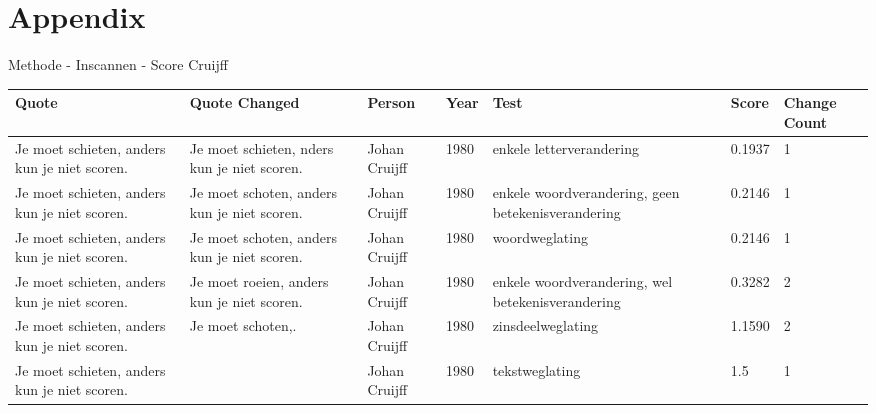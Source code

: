 \documentclass[12pt]{article}
\begin{document}
\printbibliography[heading=none]

\pagebreak
\section{Appendix} 

\Large Methode - Inscannen - Score
\noindent\large Cruijff
\small
\begin{longtable}{|p{}|p{}|p{}|p{}|p{}|p{}|p{}|}
\hline
\textbf{Quote} & \textbf{Quote Changed} & \textbf{Person} & \textbf{Year} & \textbf{Test} & \textbf{Score} & \textbf{Change Count} \\
\hline
\endhead
%
\endfoot
%
Je moet schieten, anders kun je niet scoren. & Je moet schieten, nders kun je niet scoren. & Johan Cruijff & 1980 & enkele letterverandering & 0.1937 & 1 \\
\hline
Je moet schieten, anders kun je niet scoren. & Je moet schoten, anders kun je niet scoren. & Johan Cruijff & 1980 & enkele woordverandering, geen betekenisverandering & 0.2146 & 1 \\
\hline
Je moet schieten, anders kun je niet scoren. & Je moet schoten, anders kun je niet scoren. & Johan Cruijff & 1980 & woordweglating & 0.2146 & 1 \\
\hline
Je moet schieten, anders kun je niet scoren. & Je moet roeien, anders kun je niet scoren. & Johan Cruijff & 1980 & enkele woordverandering, wel betekenisverandering & 0.3282 & 2 \\
\hline
Je moet schieten, anders kun je niet scoren. & Je moet schoten,. & Johan Cruijff & 1980 & zinsdeelweglating & 1.1590 & 2 \\
\hline
Je moet schieten, anders kun je niet scoren. &  & Johan Cruijff & 1980 & tekstweglating & 1.5 & 1 \\
\hline
\end{longtable}
\end{document}
